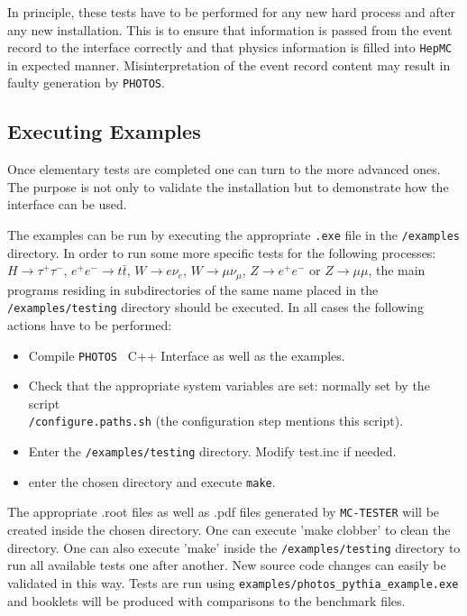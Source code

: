 \documentclass[]{Photos_interface_design}
\begin{document}
In principle, these tests have to be performed for any new hard 
process and after any new installation. This is to ensure that 
information is passed from the event record to the interface 
correctly and that physics information is filled into {\tt HepMC} 
in expected manner. Misinterpretation of the event record content may result in 
faulty generation by {\tt PHOTOS}.


\subsection{Executing Examples}

Once elementary tests are completed one can turn to the more advanced ones.
The purpose is not only to validate the installation but to demonstrate how the
interface can be used.

The examples can be run by executing the appropriate {\tt .exe} file in the {\tt /examples} directory.
In order to run some more specific tests for the following processes:
$H \rightarrow \tau^+ \tau^-$, $ e^+ e^- \rightarrow t \bar t$,
$W \rightarrow e \nu_e$, $W \rightarrow \mu \nu_\mu$,
$Z \rightarrow e^+ e^-$ or $Z \rightarrow \mu \mu$,
the main programs residing in subdirectories of the same name placed in the
{\tt /examples/testing} directory should be executed.
In all cases the following actions have to be performed:

\begin{itemize}
  \item Compile {\tt PHOTOS } C++ Interface as well as the examples. 
 \item  Check that the appropriate system variables are set: normally set by the script \\
{\tt /configure.paths.sh} (the configuration step mentions this script).
  \item Enter the {\tt /examples/testing} directory. Modify test.inc if needed.
  \item enter the chosen directory and execute {\tt make}.
\end{itemize}

The appropriate .root files as well as .pdf files generated by {\tt MC-TESTER}
will be created inside the chosen directory. One can execute 'make clobber' to
clean the directory. One can also execute 'make' inside the {\tt /examples/testing}
directory to run all available tests one after another. New source
code changes can easily be validated in this way.
Tests are run using {\tt examples/photos\_pythia\_example.exe} 
and booklets will be produced with comparisons to the benchmark files.
\end{document}
